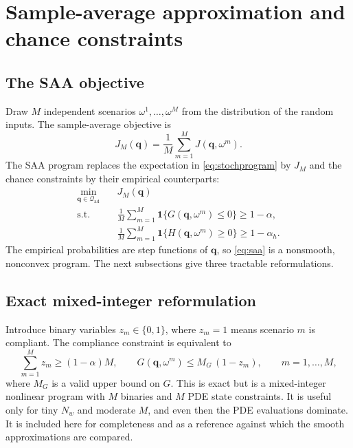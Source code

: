 \documentclass[11pt]{article}
\numberwithin{equation}{section}
\newcommand{\ind}{\mathbf{1}}
\theoremstyle{plain}
\begin{document}
\section{Sample-average approximation and chance constraints}
\label{sec:saa}

\subsection{The SAA objective}

Draw $M$ independent scenarios $\omega^1,\dots,\omega^M$ from the distribution
of the random inputs.  The sample-average objective is
\begin{equation}
\label{eq:Jsaa}
J_M(\mathbf{q})
=\frac{1}{M}\sum_{m=1}^{M}J(\mathbf{q},\omega^m).
\end{equation}
The SAA program replaces the expectation in \eqref{eq:stochprogram} by
$J_M$ and the chance constraints by their empirical counterparts:
\begin{equation}
\label{eq:saa}
\begin{aligned}
\min_{\mathbf{q}\in\mathcal{Q}_{\mathrm{ad}}}\quad
& J_M(\mathbf{q})\\
\text{s.t.}\quad
& \frac{1}{M}\sum_{m=1}^{M}\ind\{G(\mathbf{q},\omega^m)\le0\}
  \ge1-\alpha,\\
& \frac{1}{M}\sum_{m=1}^{M}\ind\{H(\mathbf{q},\omega^m)\ge0\}
  \ge1-\alpha_h.
\end{aligned}
\end{equation}
The empirical probabilities are step functions of $\mathbf{q}$, so
\eqref{eq:saa} is a nonsmooth, nonconvex program.  The next subsections give
three tractable reformulations.

\subsection{Exact mixed-integer reformulation}

Introduce binary variables $z_m\in\{0,1\}$, where $z_m=1$ means scenario $m$
is compliant.  The compliance constraint is equivalent to
\begin{equation}
\label{eq:minlp}
\sum_{m=1}^{M}z_m\ge(1-\alpha)M,
\qquad
G(\mathbf{q},\omega^m)\le M_G\,(1-z_m),
\qquad m=1,\dots,M,
\end{equation}
where $M_G$ is a valid upper bound on $G$.  This is exact but is a
mixed-integer nonlinear program with $M$ binaries and $M$ PDE state
constraints.  It is useful only for tiny $N_w$ and moderate $M$, and even then
the PDE evaluations dominate.  It is included here for completeness and as a
reference against which the smooth approximations are compared.
\end{document}
